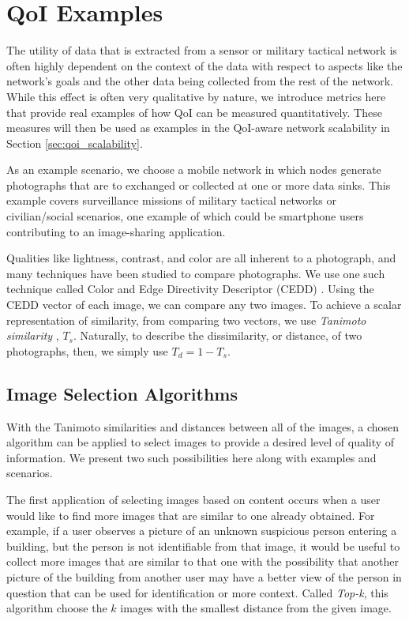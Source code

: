 
\section{QoI Examples}
\label{sec:qoi_examples}

The utility of data that is extracted from a sensor or military tactical network is often highly dependent on the context of the data with respect to aspects like the network's goals and the other data being collected from the rest of the network.  While this effect is often very qualitative by nature, we introduce metrics here that provide real examples of how QoI can be measured quantitatively.  These measures will then be used as examples in the QoI-aware network scalability in Section \ref{sec:qoi_scalability}.  

As an example scenario, we choose a mobile network in which nodes generate photographs that are to exchanged or collected at one or more data sinks.  This example covers surveillance missions of military tactical networks or civilian/social scenarios, one example of which could be smartphone users contributing to an image-sharing application.  

Qualities like lightness, contrast, and color are all inherent to a photograph, and many techniques have been studied to compare photographs.  We use one such technique called Color and Edge Directivity Descriptor (CEDD) \cite{2008cedd}.  Using the CEDD vector of each image, we can compare any two images.  To achieve a scalar representation of similarity, from comparing two vectors, we use \emph{Tanimoto similarity} \cite{tanimoto}, $T_s$.  Naturally, to describe the dissimilarity, or distance, of two photographs, then, we simply use $T_d = 1 - T_s$.

\subsection{Image Selection Algorithms}

With the Tanimoto similarities and distances between all of the images, a chosen algorithm can be applied to select images to provide a desired level of quality of information.  We present two such possibilities here along with examples and scenarios.

The first application of selecting images based on content occurs when a user would like to find more images that are similar to one already obtained.  For example, if a user observes a picture of an unknown suspicious person entering a building, but the person is not identifiable from that image, it would be useful to collect more images that are similar to that one with the possibility that another picture of the building from another user may have a better view of the person in question that can be used for identification or more context.  Called \emph{Top-k}, this algorithm choose the $k$ images with the smallest distance from the given image.  

